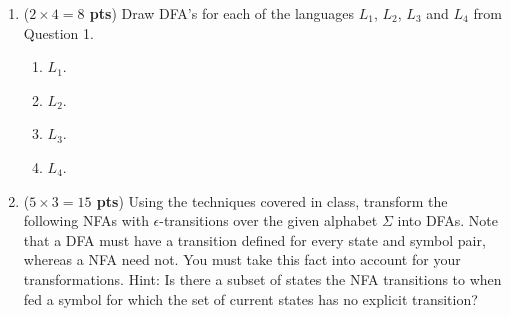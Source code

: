 \documentclass[10pt]{article}
\newcommand {\pts}[1]{({\bf #1 pts})}
\begin{document}
\begin{enumerate}
  \newpage
   \item \pts{$2\times 4=8$} Draw DFA's for each of the languages $L_1$, $L_2$, $L_3$ and $L_4$ from Question 1.
  \begin{enumerate}
    \item $L_1$.
    \\
    \begin{tikzpicture}[shorten >=1pt,node distance=2cm,on grid,auto]
    \end{tikzpicture}
    \item $L_2$.
    \\
    \begin{tikzpicture}[shorten >=1pt,node distance=2cm,on grid,auto]
    \end{tikzpicture}
    \item $L_3$.
    \\
    \begin{tikzpicture}[shorten >=1pt,node distance=2cm,on grid,auto]
    \end{tikzpicture}
     \item $L_4$.
    \\
    \begin{tikzpicture}[shorten >=1pt,node distance=2cm,on grid,auto]
    \end{tikzpicture}
  \end{enumerate}

   \newpage


  \item \pts{$5\times 3=15$} Using the techniques covered in class, transform the following NFAs with $\epsilon$-transitions over the given alphabet $\Sigma$ into DFAs. Note that a DFA must have a transition defined for every state and symbol pair, whereas a NFA need not. You must take this fact into account for your transformations. Hint: Is there a subset of states the NFA transitions to when fed a symbol for which the set of current states has no explicit transition?


\end{enumerate}
\end{document}
